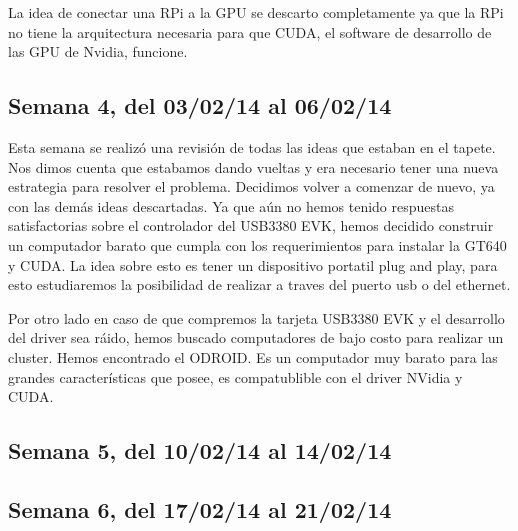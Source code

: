 \documentclass[11pt,oneside,titlepage]{article}
\begin{document}
La idea de conectar una RPi a la GPU se descarto completamente ya que la RPi no 
tiene la arquitectura necesaria para que CUDA, el software de desarrollo de las GPU de Nvidia, funcione.

\subsection*{Semana 4, del 03/02/14 al 06/02/14}

Esta semana se realizó una revisión de todas las ideas que estaban en el
tapete. Nos dimos cuenta que estabamos dando vueltas y era necesario tener una
nueva estrategia para resolver el problema. Decidimos volver a comenzar de
nuevo, ya con las demás ideas descartadas. Ya que aún no hemos tenido
respuestas satisfactorias sobre el controlador del USB3380 EVK, hemos decidido
construir un computador barato que cumpla con los requerimientos para instalar
la GT640 y CUDA. La idea sobre esto es tener un dispositivo portatil plug and
play, para esto estudiaremos la posibilidad de realizar a traves del puerto usb
o del ethernet. 

Por otro lado en caso de que compremos la tarjeta USB3380 EVK y el desarrollo
del driver sea ráido, hemos buscado computadores de bajo costo para realizar un
cluster. Hemos encontrado el ODROID. Es un computador muy barato para las
grandes características que posee, es compatublible con el driver NVidia y
CUDA.

\subsection*{Semana 5, del 10/02/14 al 14/02/14}
\begin{comment}
lunes
-
Ademas se realizó un estudio sobre como conectar el comptuador de una forma
plug and play, las opciones son utilizar el puerto Ethernet o, mejor aún,
realizar la conexión a trav\'es USB.

martes 
- Reunion con el profesor para ver el estado del proyecto. 3 ideas
  nuevas aparecieron.

miercoles 
- Contacto con un desarrollador de USB3380 para solicitar ayuda en el
  campo. 
- Estudio de RNDIS para conectar usb a usb, existe la posibilidad.

jueves 
- Estudio del funcionamiento de usb. Aprendi que podemos utilizar el
  computador como gadget y realizar la configuración recompilando el kernel y
  agregando los drivers.Mas detalles leer Linux Gadget Drivers
- Aún falta el cable. 
- Compilación del kernel para agregar los módulos. Estamos a la espera
  del cable USB macho macho.

viernes 
- Update del proyecto al profesor Claudio torres. 
 - compramos cable USB 3.0, estamos a la espera del envío.
\end{comment}


\subsection*{Semana 6, del 17/02/14 al 21/02/14}
\end{document}
